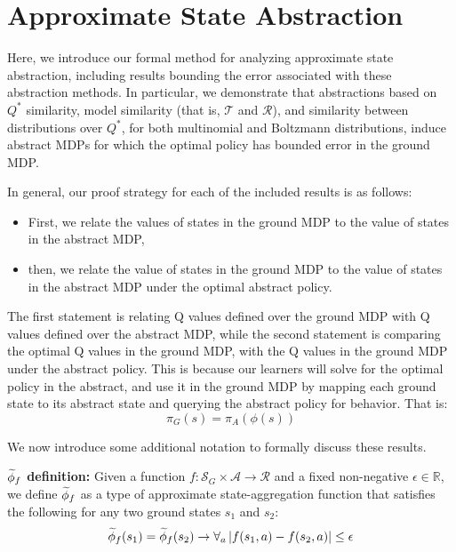 \section{Approximate State Abstraction}

Here, we introduce our formal method for analyzing approximate state abstraction, including results bounding the error associated with these abstraction methods. In particular, we demonstrate that abstractions based on $Q^*$ similarity, model similarity (that is, $\mathcal{T}$ and $\mathcal{R}$), and similarity between distributions over $Q^*$, for both multinomial and Boltzmann distributions, induce abstract \acp{MDP} for which the optimal policy has bounded error in the ground MDP.

In general, our proof strategy for each of the included results is as follows:
\begin{itemize}
\item First, we relate the values of states in the ground MDP to the value of states in the abstract \ac{MDP},
\item then, we relate the value of states in the ground \ac{MDP} to the value of states in the abstract \ac{MDP} under the optimal abstract policy.
\end{itemize}

The first statement is relating Q values defined over the ground MDP with Q values defined over the abstract MDP, while the second statement is comparing the optimal Q values in the ground MDP, with the Q values in the ground MDP under the abstract policy. This is because our learners will solve for the optimal policy in the abstract, and use it in the ground MDP by mapping each ground state to its abstract state and querying the abstract policy for behavior. That is:
\begin{equation}
\pi_G(s) = \pi_A(\phi(s))
\end{equation}



We now introduce some additional notation to formally discuss these results.

{\bf $\widetilde \phi_f$ definition:} Given a function $f: \mathcal{S}_G \times \mathcal{A} \rightarrow \mathcal{R}$ and a fixed non-negative $\epsilon \in \mathbb{R}$, we define $\widetilde \phi_f$ as a type of approximate state-aggregation function that satisfies the following for any two ground states $s_1$ and $s_2$: 
\begin{equation}
\label{eq:phi_f}
\widetilde \phi_f(s_1) = \widetilde \phi_f(s_2) \rightarrow \forall_a \left|f(s_1, a) - f(s_2, a)\right| \leq \epsilon
\end{equation}

